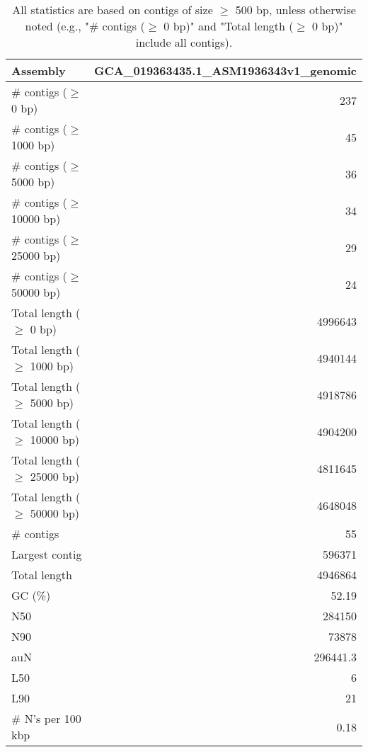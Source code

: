 \documentclass[12pt,a4paper]{article}
\begin{document}
\begin{table}[ht]
\begin{center}
\caption{All statistics are based on contigs of size $\geq$ 500 bp, unless otherwise noted (e.g., "\# contigs ($\geq$ 0 bp)" and "Total length ($\geq$ 0 bp)" include all contigs).}
\begin{tabular}{|l*{1}{|r}|}
\hline
Assembly & GCA\_019363435.1\_ASM1936343v1\_genomic \\ \hline
\# contigs ($\geq$ 0 bp) & 237 \\ \hline
\# contigs ($\geq$ 1000 bp) & 45 \\ \hline
\# contigs ($\geq$ 5000 bp) & 36 \\ \hline
\# contigs ($\geq$ 10000 bp) & 34 \\ \hline
\# contigs ($\geq$ 25000 bp) & 29 \\ \hline
\# contigs ($\geq$ 50000 bp) & 24 \\ \hline
Total length ($\geq$ 0 bp) & 4996643 \\ \hline
Total length ($\geq$ 1000 bp) & 4940144 \\ \hline
Total length ($\geq$ 5000 bp) & 4918786 \\ \hline
Total length ($\geq$ 10000 bp) & 4904200 \\ \hline
Total length ($\geq$ 25000 bp) & 4811645 \\ \hline
Total length ($\geq$ 50000 bp) & 4648048 \\ \hline
\# contigs & 55 \\ \hline
Largest contig & 596371 \\ \hline
Total length & 4946864 \\ \hline
GC (\%) & 52.19 \\ \hline
N50 & 284150 \\ \hline
N90 & 73878 \\ \hline
auN & 296441.3 \\ \hline
L50 & 6 \\ \hline
L90 & 21 \\ \hline
\# N's per 100 kbp & 0.18 \\ \hline
\end{tabular}
\end{center}
\end{table}
\end{document}
